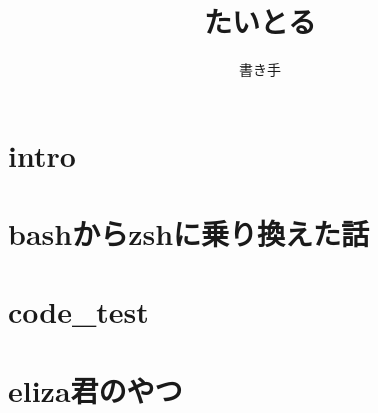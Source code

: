 \documentclass[10.5pt,a4paper]{jsbook}
\title{たいとる}
\author{書き手}
\date{}
\begin{document}
\maketitle
\tableofcontents

\chapter{intro}


\newpage

\chapter{bashからzshに乗り換えた話}


\newpage

\chapter{code\_test}


\newpage

\chapter{eliza君のやつ}

\end{document}
